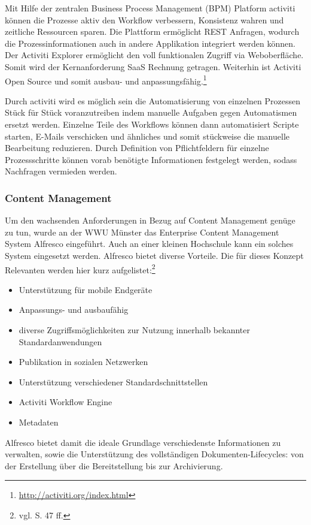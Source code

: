 Mit Hilfe der zentralen Business Process Management (BPM) Platform activiti können die Prozesse aktiv den Workflow verbessern, Konsistenz wahren und zeitliche Ressourcen sparen.  Die Plattform ermöglicht REST Anfragen, wodurch die Prozessinformationen auch in andere Applikation integriert werden können. Der Activiti Explorer ermöglicht den voll funktionalen Zugriff via Weboberfläche. Somit wird der Kernanforderung SaaS Rechnung getragen. Weiterhin ist Activiti Open Source und somit ausbau- und anpassungsfähig.\footnote{\url{http://activiti.org/index.html}}

Durch activiti wird es möglich sein die Automatisierung von einzelnen Prozessen Stück für Stück voranzutreiben indem manuelle Aufgaben gegen Automatismen ersetzt werden. Einzelne Teile des Workflows können dann automatisiert Scripte starten, E-Mails verschicken und ähnliches und somit stückweise die manuelle Bearbeitung reduzieren. Durch Definition von Pflichtfeldern für einzelne Prozessschritte können vorab benötigte Informationen festgelegt werden, sodass Nachfragen vermieden werden.

\subsubsection{Content Management}
Um den wachsenden Anforderungen in Bezug auf Content Management genüge zu tun, wurde an der WWU Münster das Enterprise Content Management System Alfresco eingeführt. Auch an einer kleinen Hochschule kann ein solches System eingesetzt werden. Alfresco bietet diverse Vorteile. Die für dieses Konzept Relevanten werden hier kurz aufgelistet:\footnote{vgl. \cite{kloetgen_2012} S. 47 ff.}

\begin{itemize}
	\item Unterstützung für mobile Endgeräte
	\item Anpassungs- und ausbaufähig
	\item diverse Zugriffsmöglichkeiten zur Nutzung innerhalb bekannter Standardanwendungen
	\item Publikation in sozialen Netzwerken
	\item Unterstützung verschiedener Standardschnittstellen
	\item Activiti Workflow Engine
	\item Metadaten
\end{itemize}

Alfresco bietet damit die ideale Grundlage verschiedenste Informationen zu verwalten, sowie die Unterstützung des vollständigen Dokumenten-Lifecycles: von der Erstellung über die Bereitstellung bis zur Archivierung. 

